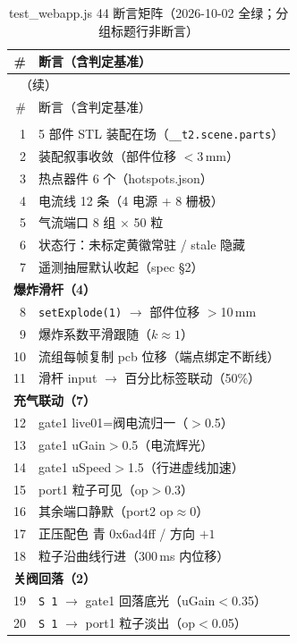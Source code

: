 \begin{longtable}{@{}rp{11.2cm}@{}}
  \caption{test\_webapp.js 44 断言矩阵（2026-10-02 全绿；分组标题行非断言）}\label{tab:acc-webapp}\\
  \toprule
  \# & 断言（含判定基准） \\
  \midrule
  \endfirsthead
  \multicolumn{2}{l}{\tablename~\thetable{}（续）}\\
  \toprule
  \# & 断言（含判定基准） \\
  \midrule
  \endhead
  \bottomrule
  \endfoot
  \endlastfoot
  \multicolumn{2}{l}{\textbf{加载与首屏（7）}} \\
  1 & 5 部件 STL 装配在场（\texttt{\_\_t2.scene.parts}） \\
  2 & 装配叙事收敛（部件位移 $<$3\,mm） \\
  3 & 热点器件 6 个（hotspots.json） \\
  4 & 电流线 12 条（4 电源 + 8 栅极） \\
  5 & 气流端口 8 组 $\times$ 50 粒 \\
  6 & 状态行：未标定黄徽常驻 / stale 隐藏 \\
  7 & 遥测抽屉默认收起（spec \S2） \\
  \midrule
  \multicolumn{2}{l}{\textbf{爆炸滑杆（4）}} \\
  8 & \texttt{setExplode(1)} $\to$ 部件位移 $>$10\,mm \\
  9 & 爆炸系数平滑跟随（$k\approx1$） \\
  10 & 流组每帧复制 pcb 位移（端点绑定不断线） \\
  11 & 滑杆 input $\to$ 百分比标签联动（50\%） \\
  \midrule
  \multicolumn{2}{l}{\textbf{充气联动（7）}} \\
  12 & gate1 live01=阀电流归一（$>$0.5） \\
  13 & gate1 uGain$>$0.5（电流辉光） \\
  14 & gate1 uSpeed$>$1.5（行进虚线加速） \\
  15 & port1 粒子可见（op$>$0.3） \\
  16 & 其余端口静默（port2 op$\approx$0） \\
  17 & 正压配色 青 0x6ad4ff / 方向 $+1$ \\
  18 & 粒子沿曲线行进（300\,ms 内位移） \\
  \midrule
  \multicolumn{2}{l}{\textbf{关阀回落（2）}} \\
  19 & \texttt{S 1} $\to$ gate1 回落底光（uGain$<$0.35） \\
  20 & \texttt{S 1} $\to$ port1 粒子淡出（op$<$0.05） \\

\end{longtable}
